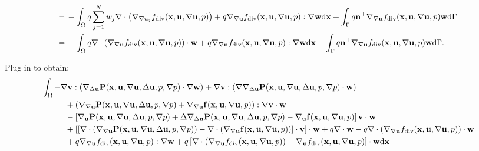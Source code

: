 \documentclass[oneside]{book}
\numberwithin{equation}{section}
\begin{document}
\begin{enumerate}[leftmargin=0in]
\begin{align*}
        =&\, -\int_\Omega q\sum_{j=1}^N w_j\nabla\cdot\left(\nabla_{\nabla u_j}f_{\rm div}({\bf x},{\bf u},\nabla{\bf u},p)\right) + q\nabla_{\nabla{\bf u}}f_{\rm div}({\bf x},{\bf u},\nabla{\bf u},p):\nabla{\bf w}{\rm d}{\bf x} + \int_\Gamma q{\bf n}^\top\nabla_{\nabla{\bf u}}f_{\rm div}({\bf x},{\bf u},\nabla{\bf u},p){\bf w}{\rm d}\Gamma\\
        =&\, -\int_\Omega q\nabla\cdot\left(\nabla_{\nabla{\bf u}}f_{\rm div}({\bf x},{\bf u},\nabla{\bf u},p)\right)\cdot{\bf w} + q\nabla_{\nabla{\bf u}}f_{\rm div}({\bf x},{\bf u},\nabla{\bf u},p):\nabla{\bf w}{\rm d}{\bf x} + \int_\Gamma q{\bf n}^\top\nabla_{\nabla{\bf u}}f_{\rm div}({\bf x},{\bf u},\nabla{\bf u},p){\bf w}{\rm d}\Gamma.
    \end{align*}
\end{enumerate}
Plug in to obtain:
\begin{align*}
    &\int_\Omega -\nabla{\bf v}:\left(\nabla_{\Delta{\bf u}}{\bf P}({\bf x},{\bf u},\nabla{\bf u},\Delta{\bf u},p,\nabla p)\cdot\nabla{\bf w}\right) + \nabla{\bf v}:\left(\nabla\nabla_{\Delta{\bf u}}{\bf P}({\bf x},{\bf u},\nabla{\bf u},\Delta{\bf u},p,\nabla p)\cdot{\bf w}\right)\\
    &\hspace{1cm} + \left(\nabla_{\nabla{\bf u}}{\bf P}({\bf x},{\bf u},\nabla{\bf u},\Delta{\bf u},p,\nabla p) + \nabla_{\nabla{\bf u}}{\bf f}({\bf x},{\bf u},\nabla{\bf u},p)\right):\nabla{\bf v}\cdot{\bf w}\\
    &\hspace{1cm} - \left[\nabla_{\bf u}{\bf P}({\bf x},{\bf u},\nabla{\bf u},\Delta{\bf u},p,\nabla p) + \Delta\nabla_{\Delta{\bf u}}{\bf P}({\bf x},{\bf u},\nabla{\bf u},\Delta{\bf u},p,\nabla p) - \nabla_{\bf u}{\bf f}({\bf x},{\bf u},\nabla{\bf u},p)\right]{\bf v}\cdot{\bf w}\\
    &\hspace{1cm}+ \left[\left[\nabla\cdot\left(\nabla_{\nabla{\bf u}}{\bf P}({\bf x},{\bf u},\nabla{\bf u},\Delta{\bf u},p,\nabla p)\right) - \nabla\cdot\left(\nabla_{\nabla{\bf u}}{\bf f}({\bf x},{\bf u},\nabla{\bf u},p)\right)\right]\cdot{\bf v}\right]\cdot{\bf w} + q\nabla\cdot{\bf w} - q\nabla\cdot\left(\nabla_{\nabla{\bf u}}f_{\rm div}({\bf x},{\bf u},\nabla{\bf u},p)\right)\cdot{\bf w}\\
    &\hspace{1cm}+ q\nabla_{\nabla{\bf u}}f_{\rm div}({\bf x},{\bf u},\nabla{\bf u},p):\nabla{\bf w} + q\left[\nabla\cdot\left(\nabla_{\nabla{\bf u}}f_{\rm div}({\bf x},{\bf u},\nabla{\bf u},p)\right) - \nabla_{\bf u}f_{\rm div}({\bf x},{\bf u},\nabla{\bf u},p)\right]\cdot{\bf w}{\rm d}{\bf x}\\

\end{align*}
\end{document}
